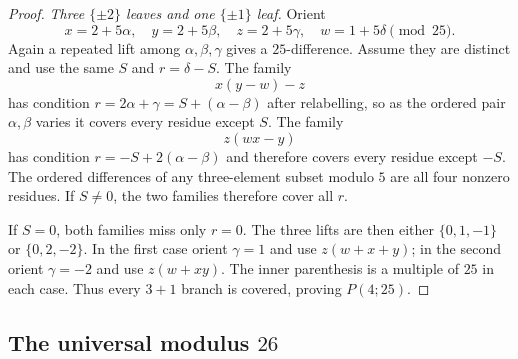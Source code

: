 \begin{proof}
\emph{Three $\{\pm2\}$ leaves and one $\{\pm1\}$ leaf.}
Orient
\[
 x=2+5\alpha,\quad y=2+5\beta,\quad z=2+5\gamma,
 \quad w=1+5\delta \pmod{25}.
\]
Again a repeated lift among $\alpha,\beta,\gamma$ gives a $25$-difference.
Assume they are distinct and use the same $S$ and $r=\delta-S$.  The family
\[
 x(y-w)-z
\]
has condition $r=2\alpha+\gamma=S+(\alpha-\beta)$ after relabelling, so as
the ordered pair $\alpha,\beta$ varies it covers every residue except $S$.
The family
\[
 z(wx-y)
\]
has condition $r=-S+2(\alpha-\beta)$ and therefore covers every residue
except $-S$.  The ordered differences of any three-element subset modulo $5$
are all four nonzero residues.  If $S\ne0$, the two families therefore cover
all $r$.

If $S=0$, both families miss only $r=0$.  The three lifts are then either
$\{0,1,-1\}$ or $\{0,2,-2\}$.  In the first case orient $\gamma=1$ and use
$z(w+x+y)$; in the second orient $\gamma=-2$ and use $z(w+xy)$.  The inner
parenthesis is a multiple of $25$ in each case.  Thus every $3+1$ branch is
covered, proving $P(4;25)$.
\end{proof}

\subsection{\texorpdfstring{The universal modulus $26$}{The universal modulus 26}}\label{app:p26}

